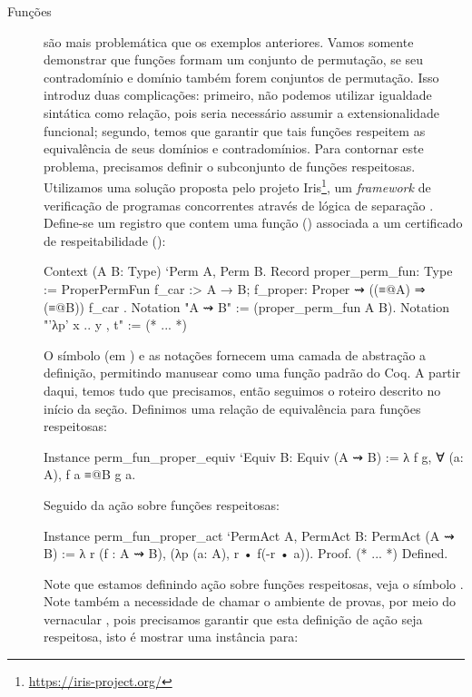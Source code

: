 \begin{description}
	\item[Funções] são mais problemática que os exemplos anteriores. Vamos somente demonstrar que funções formam um conjunto de permutação, se seu contradomínio e domínio também forem conjuntos de permutação. Isso introduz duas complicações: primeiro, não podemos utilizar igualdade sintática como relação, pois seria necessário assumir a extensionalidade funcional; segundo, temos que garantir que tais funções respeitem as equivalência de seus domínios e contradomínios. 
	Para contornar este problema, precisamos definir o subconjunto de funções respeitosas. Utilizamos uma solução proposta pelo projeto Iris\footnote{\url{https://iris-project.org/}}, um \textit{framework} de verificação de programas concorrentes através de lógica de separação \cite{Jung2015,Jung2016}. Define-se um registro que contem uma função () associada a um certificado de respeitabilidade ():
	\begin{coqcode}
Context (A B: Type) `{Perm A, Perm B}.
Record proper_perm_fun: Type := ProperPermFun {
   f_car :> A → B;
   f_proper: Proper ⇝ ((≡@{A}) ⇒ (≡@{B})) f_car
}.
Notation "A ⇝ B" := (proper_perm_fun A B).
Notation "'λp' x .. y , t" := (* ... *)
	\end{coqcode}
	O símbolo \coqinline{:>} (em ) e as notações fornecem uma camada de abstração a definição, permitindo manusear  como uma função padrão do Coq. A partir daqui, temos tudo que precisamos, então seguimos o roteiro descrito no início da seção. Definimos uma relação de equivalência para funções respeitosas:
	\begin{coqcode}
Instance perm_fun_proper_equiv `{Equiv B}: Equiv (A ⇝ B) := 
   λ f g, ∀ (a: A), f a ≡@{B} g a.
	\end{coqcode}
	Seguido da ação sobre funções respeitosas:
	\begin{coqcode}
Instance perm_fun_proper_act `{PermAct A, PermAct B}: PermAct (A ⇝ B) :=
   λ r (f : A ⇝ B), (λp (a: A), r • f(-r • a)).
Proof. (* ... *) Defined.
	\end{coqcode}
	Note que estamos definindo ação sobre funções respeitosas, veja o símbolo . Note também a necessidade de chamar o ambiente de provas, por meio do vernacular , pois precisamos garantir que esta definição de ação seja respeitosa, isto é mostrar uma instância para:

\end{description}
